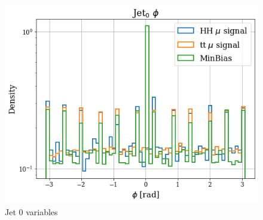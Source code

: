 \documentclass[../main.tex]{subfiles}
\begin{document}
\begin{figure}[!ht]
\begin{minipage}[b]{0.33\linewidth}
    \centering
    \includegraphics[width=1\linewidth]{Chapters/Plots/Hist_1mu_jet0_Phi.png}
  \end{minipage}
  \caption{Jet 0 variables}
\end{figure}
\end{document}
